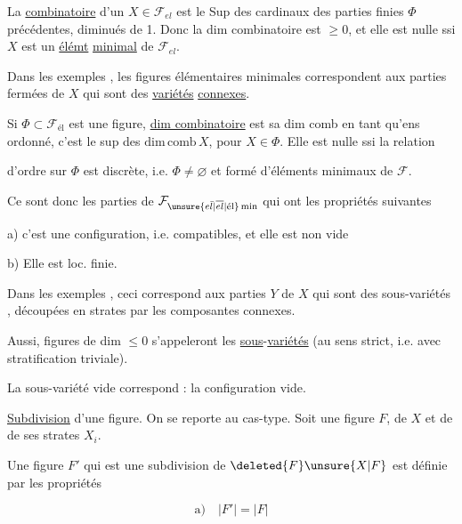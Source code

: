 La \uline{} \uline{combinatoire} d'un $X\in\mathcal{F}_{el}$ est le Sup des cardinaux des parties finies $\Phi$ précédentes, diminués de 1. Donc la dim combinatoire est $\geq 0$, et elle est nulle ssi $X$ est un \uline{élémt} \uline{minimal} de $\mathcal{F}_{el}$.

Dans les exemples ,  les figures élémentaires minimales correspondent aux parties fermées de $X$ qui sont des \uline{variétés} \uline{connexes}.

Si $\Phi\subset\mathcal{F}_{\text{él}}$ est une figure,  \uline{dim combinatoire} est sa dim comb en tant qu'ens ordonné, c'est  le sup des $\mathrm{dim\,comb}\,X$, pour $X\in\Phi$. Elle est nulle ssi   la relation


d'ordre sur $\Phi$ est discrète, i.e. $\Phi\neq\varnothing$ et formé d'éléments minimaux de $\mathcal{F}$.

Ce sont donc les  parties de $\mathcal{F}_{\unsure{e\bar l|\overline{el}|\text{él}}\,\mathrm{min}}$ qui ont les propriétés suivantes

a) c'est une configuration, i.e.    compatibles, et elle est non vide

b) Elle est loc. finie.

Dans les exemples , ceci correspond aux parties  $Y$ de $X$ qui sont des sous-variétés , découpées en strates par les composantes connexes.

Aussi,  figures de dim $\leq 0$ s'appeleront les \uline{sous}-\uline{variétés} (au sens strict, i.e. avec stratification triviale).

La sous-variété vide correspond : la configuration vide.

\uline{Subdivision} d'une figure.  On se reporte au cas-type. Soit une figure $F$,  de $X$ et de  de ses strates $X_i$.

Une  figure $F'$ qui est une subdivision de $\deleted{F}\unsure{X|F}$ est  définie par les propriétés

\[
\text{a)}\quad |F'|=|F|
\]

